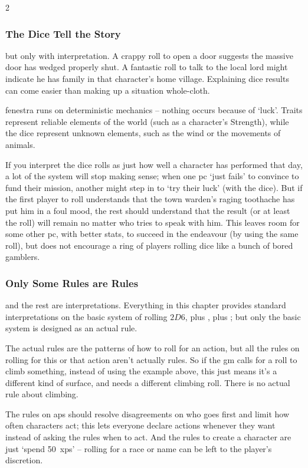\begin{multicols}{2}
\subsubsection{The Dice Tell the Story}
but only with interpretation.
A crappy roll to open a door suggests the massive door has wedged properly shut.
A fantastic roll to talk to the local lord might indicate he has family in that character's home \gls{village}.
Explaining dice results can come easier than making up a situation whole-cloth.

\Gls{fenestra} runs on deterministic mechanics -- nothing occurs because of `luck'.
Traits represent reliable elements of the world (such as a character's Strength), while the dice represent unknown elements, such as the wind or the movements of animals.

If you interpret the dice rolls as just how well a character has performed that day, a lot of the system will stop making sense; when one \gls{pc} `just fails' to convince  to fund their mission, another might step in to `try their luck' (with the dice).
But if the first player to roll understands that the town \gls{warden}'s raging toothache has put him in a foul mood, the rest should understand that the result (or at least the roll) will remain no matter who tries to speak with him.
This leaves room for some other \gls{pc}, with better stats, to succeed in the endeavour (by using the same roll), but does not encourage a ring of players rolling dice like a bunch of bored gamblers.

\subsubsection{Only Some Rules are Rules}
and the rest are interpretations.
Everything in this chapter provides standard interpretations on the basic system of rolling $2D6$, plus , plus ; but only the basic system is designed as an actual rule.

The actual rules are the patterns of how to roll for an action, but all the rules on rolling for this or that action aren't actually rules.
So if the \gls{gm} calls for a  roll to climb something, instead of using the example above, this just means it's a different kind of surface, and needs a different climbing roll.
There is no actual rule about climbing.

The rules on \glspl{ap} should resolve disagreements on who goes first and limit how often characters act; this lets everyone declare \glspl{action} whenever they want instead of asking the rules when to act.
And the rules to create a character are just `spend 50~\glspl{xp}' -- rolling for a race or name can be left to the player's discretion.%


\end{multicols}
